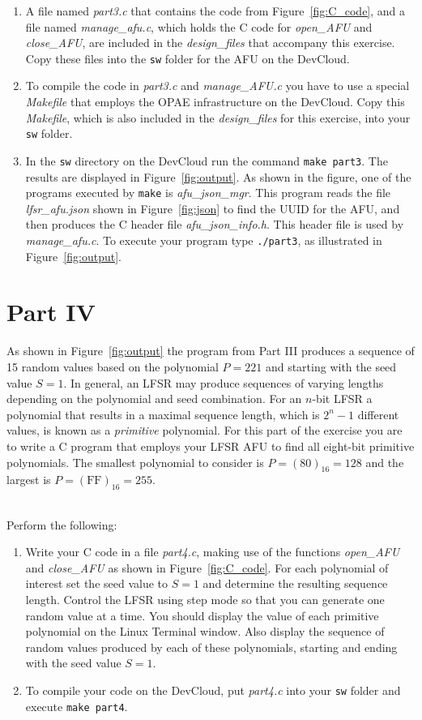 \documentclass[epsfig,10pt,fullpage]{article}
\begin{document}
\begin{enumerate}
\item
A file named {\it part3.c} that contains the code from Figure~\ref{fig:C_code}, and a file 
named {\it manage\_afu.c}, which holds the C code for {\it open\_AFU} and {\it close\_AFU},
are included in the {\it design\_files} that accompany this exercise.
Copy these files into the \texttt{sw} folder for the AFU on the DevCloud.
\item
To compile the code in {\it part3.c} and {\it manage\_AFU.c} you have to use a special 
{\it Makefile} that employs the OPAE infrastructure on the DevCloud. Copy this {\it Makefile}, 
which is also included in the {\it design\_files} for this exercise, into your \texttt{sw} folder. 
\item
In the \texttt{sw} directory on the DevCloud run the command \texttt{make part3}. The
results are displayed in Figure~\ref{fig:output}. As shown in the figure,
one of the programs executed by \texttt{make} is {\it afu\_json\_mgr}. This
program reads the file {\it lfsr\_afu.json} shown in Figure~\ref{fig:json} to find the 
UUID for the AFU, and then produces the C header file {\it afu\_json\_info.h}. This header
file is used by {\it manage\_afu.c}. To execute your program type \texttt{./part3}, 
as illustrated in Figure~\ref{fig:output}.
\end{enumerate}

\section*{Part IV}
As shown in Figure~\ref{fig:output} the program from Part III produces a sequence of 
15 random values based on the
polynomial $P = 221$ and starting with the seed value $S = 1$.  In general, an LFSR may
produce sequences of varying lengths depending on the polynomial and seed combination. For
an $n$-bit LFSR a polynomial that results in a maximal sequence length, which is $2^n -1$
different values, is known as a {\it primitive} polynomial. For this part of the exercise
you are to write a C program that employs your LFSR AFU to find all eight-bit primitive
polynomials. The smallest polynomial to consider is $P = (80)_{16} = 128$ and the largest
is $P = (\mathrm{FF})_{16} = 255$.

~\\
\noindent Perform the following:

\begin{enumerate}
\item
Write your C code in a file {\it part4.c}, making use of the functions {\it open\_AFU} and
{\it close\_AFU} as shown in Figure~\ref{fig:C_code}. For each polynomial of interest 
set the seed value to $S = 1$ and determine the resulting sequence length.  Control the 
LFSR using step mode so that you can generate one random value at a time. You should
display the value of each primitive polynomial on the Linux Terminal window. Also display
the sequence of random values produced by each of these polynomials, starting and ending
with the seed value $S = 1$.
\item
To compile your code on the DevCloud, put {\it part4.c} into your \texttt{sw} folder and 
execute \texttt{make part4}.
\end{enumerate}
\end{document}
